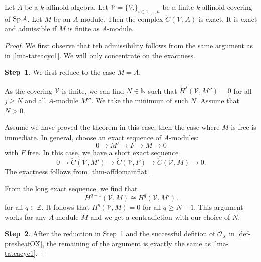 \begin{thm}\label{thm-Tateacyc}
    Let $A$ be a $k$-affinoid algebra. Let $\mathcal{V}=\{V_i\}_{i\in 1,\ldots,n}$ be a finite $k$-affinoid covering of $\operatorname{Sp} A$. Let $M$ be an $A$-module.
    Then the complex $\check{C}(\mathcal{V},A)$ is exact. It is exact and admissible if $M$ is finite as $A$-module.
\end{thm}
\begin{proof}
    We first observe that teh admissibility follows from the same argument as in \cref{lma-tateacyc1}. We will only concentrate on the exactness. 

    \textbf{Step~1}. We first reduce to the case $M=A$. 


    As the covering $\mathcal{V}$ is finite, we can find $N\in \mathbb{N}$ such that $\check{H}^j(\mathcal{V},M'')=0$ for all $j\geq N$ and all $A$-module $M''$. We take the minimum of such $N$. Assume that $N> 0$.

    Assume we have proved the theorem in this case, then the case where $M$ is free is immediate. In general, choose an exact sequence of $A$-modules:
    \[
        0\rightarrow M'\rightarrow F\rightarrow M\rightarrow 0  
    \]
    with $F$ free. In this case, we have a short exact sequence
    \[
        0\rightarrow  \check{C}(\mathcal{V},M')\rightarrow \check{C}(\mathcal{V},F)\rightarrow \check{C}(\mathcal{V},M)\rightarrow 0. 
    \]
    The exactness follows from \cref{thm-affdomainflat}. 

    From the long exact sequence, we find that
    \[
        H^{q-1}(\mathcal{V},M)\cong   H^{q}(\mathcal{V},M').
    \]
    for all $q\in \mathbb{Z}$. It follows that $H^q(\mathcal{V},M)=0$ for all $q\geq N-1$. This argument works for any $A$-module $M$ and we get a contradiction with our choice of $N$.

    \textbf{Step~2}. After the reduction in Step~1 and the successful defition of $\mathcal{O}_X$ in \cref{def-presheafOX}, the remaining of the argument is exactly the same as \cref{lma-tateacyc1}.
\end{proof}

\iffalse

\textcolor{red}{We need to verify the flatness of $A_V$}
\fi





\printbibliography
